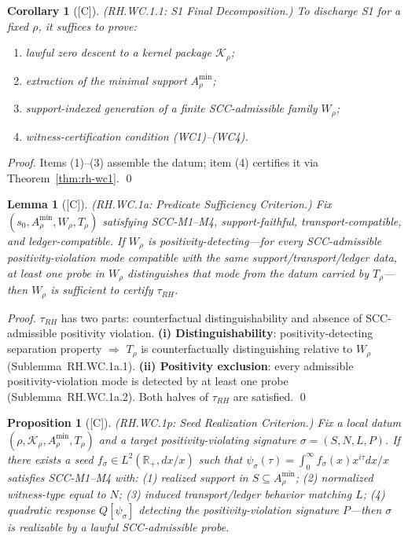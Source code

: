 \documentclass[12pt,oneside]{amsbook}
\theoremstyle{plain}
\newtheorem{lemma}[theorem]{Lemma}
\newtheorem{proposition}[theorem]{Proposition}
\newtheorem{corollary}[theorem]{Corollary}
\theoremstyle{definition}
\theoremstyle{remark}
\newcommand{\status}[1]{\textup{[#1]}}
\begin{document}
\begin{corollary}[\status{C}]\label{cor:rh-wc1-s1}
\textup{(RH.WC.1.1: S1 Final Decomposition.)}
To discharge S1 for a fixed $\rho$, it suffices to prove:
\begin{enumerate}[label=\textup{(\arabic*)}]
 \item lawful zero descent to a kernel package $\mathcal{K}_\rho$;
 \item extraction of the minimal support $A_\rho^{\min}$;
 \item support-indexed generation of a finite SCC-admissible
 family $W_\rho$;
 \item witness-certification condition (WC1)--(WC4).
\end{enumerate}
\end{corollary}

\begin{proof}
Items (1)--(3) assemble the datum; item (4) certifies it via
Theorem~\ref{thm:rh-wc1}. \qed
\end{proof}

\begin{lemma}[\status{C}]\label{lem:rh-wc1a}
\textup{(RH.WC.1a: Predicate Sufficiency Criterion.)}
Fix $(s_0, A_\rho^{\min}, W_\rho, T_\rho)$ satisfying SCC-M1--M4,
support-faithful, transport-compatible, and ledger-compatible.
If $W_\rho$ is \emph{positivity-detecting}---for every
SCC-admissible positivity-violation mode compatible with the same
support/transport/ledger data, at least one probe in $W_\rho$
distinguishes that mode from the datum carried by $T_\rho$---then
$W_\rho$ is sufficient to certify $\tau_{RH}$.
\end{lemma}

\begin{proof}
$\tau_{RH}$ has two parts: counterfactual distinguishability and
absence of SCC-admissible positivity violation.
\textbf{(i) Distinguishability}: positivity-detecting separation
property $\Rightarrow$ $T_\rho$ is counterfactually distinguishing
relative to $W_\rho$ (Sublemma~RH.WC.1a.1).
\textbf{(ii) Positivity exclusion}: every admissible
positivity-violation mode is detected by at least one probe
(Sublemma~RH.WC.1a.2).
Both halves of $\tau_{RH}$ are satisfied. \qed
\end{proof}

\begin{proposition}[\status{C}]\label{prop:rh-wc1p}
\textup{(RH.WC.1p: Seed Realization Criterion.)}
Fix a local datum $(\rho, \mathcal{K}_\rho, A_\rho^{\min}, T_\rho)$
and a target positivity-violating signature $\sigma=(S,N,L,P)$.
If there exists a seed $f_\sigma \in L^2(\mathbb{R}_+,dx/x)$ such
that $\psi_\sigma(\tau) = \int_0^\infty f_\sigma(x)x^{i\tau}dx/x$
satisfies SCC-M1--M4 with: (1) realized support in $S \subseteq
A_\rho^{\min}$; (2) normalized witness-type equal to $N$; (3)
induced transport/ledger behavior matching $L$; (4) quadratic
response $Q[\psi_\sigma]$ detecting the positivity-violation
signature $P$---then $\sigma$ is realizable by a lawful
SCC-admissible probe.
\end{proposition}
\end{document}
